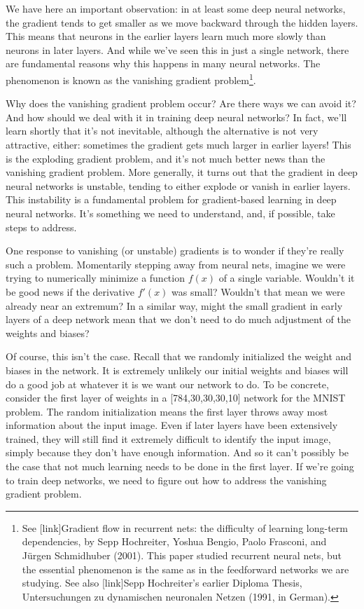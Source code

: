 \documentclass[a4paper,twoside,10pt]{book}
\begin{document}
We have here an important observation: in at least some deep neural networks, the gradient tends to get smaller as we move backward through the hidden layers. This means that neurons in the earlier layers learn much more slowly than neurons in later layers. And while we've seen this in just a single network, there are fundamental reasons why this happens in many neural networks. The phenomenon is known as the vanishing gradient problem\footnote{See [link]Gradient flow in recurrent nets: the difficulty of learning long-term dependencies, by Sepp Hochreiter, Yoshua Bengio, Paolo Frasconi, and J\"urgen Schmidhuber (2001). This paper studied recurrent neural nets, but the essential phenomenon is the same as in the feedforward networks we are studying. See also [link]Sepp Hochreiter's earlier Diploma Thesis, Untersuchungen zu dynamischen neuronalen Netzen (1991, in German).}.

Why does the vanishing gradient problem occur? Are there ways we can avoid it? And how should we deal with it in training deep neural networks? In fact, we'll learn shortly that it's not inevitable, although the alternative is not very attractive, either: sometimes the gradient gets much larger in earlier layers! This is the exploding gradient problem, and it's not much better news than the vanishing gradient problem. More generally, it turns out that the gradient in deep neural networks is unstable, tending to either explode or vanish in earlier layers. This instability is a fundamental problem for gradient-based learning in deep neural networks. It's something we need to understand, and, if possible, take steps to address.

One response to vanishing (or unstable) gradients is to wonder if they're really such a problem. Momentarily stepping away from neural nets, imagine we were trying to numerically minimize a function $f(x)$ of a single variable. Wouldn't it be good news if the derivative $f'(x)$ was small? Wouldn't that mean we were already near an extremum? In a similar way, might the small gradient in early layers of a deep network mean that we don't need to do much adjustment of the weights and biases?

Of course, this isn't the case. Recall that we randomly initialized the weight and biases in the network. It is extremely unlikely our initial weights and biases will do a good job at whatever it is we want our network to do. To be concrete, consider the first layer of weights in a [784,30,30,30,10] network for the MNIST problem. The random initialization means the first layer throws away most information about the input image. Even if later layers have been extensively trained, they will still find it extremely difficult to identify the input image, simply because they don't have enough information. And so it can't possibly be the case that not much learning needs to be done in the first layer. If we're going to train deep networks, we need to figure out how to address the vanishing gradient problem.
\end{document}
